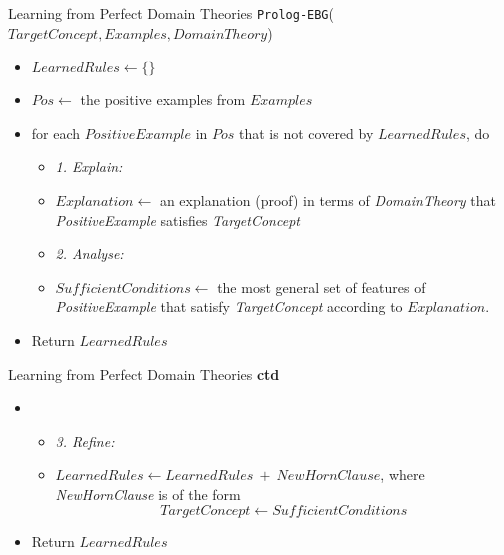 \documentclass[%
pdf,
colorBG,
slideColor,
tcrico,
]{prosper}
\begin{document}

\begin{slide}{Learning from Perfect Domain Theories}
\tiny
	\texttt{Prolog-EBG}($TargetConcept, Examples, DomainTheory$)
	
	\begin{itemize}
	\item $LearnedRules \gets \{\}$
	\item $Pos \gets$ the positive examples from $Examples$ 
	\item
	for each $PositiveExample$ in $Pos$ that is not covered by $LearnedRules$, do
	\begin{itemize}
	\item[]\hspace*{-.18in}\hskip-12pt{\em 1. Explain:}
	\item $Explanation \gets $ an explanation (proof) in terms of {\em
	DomainTheory} that {\em PositiveExample} satisfies {\em TargetConcept}
	
	\item[]\hspace*{-.18in}\hskip-12pt{\em 2. Analyse:}
	\item 
	$SufficientConditions \gets $ the most general set of features of {\em PositiveExample} that satisfy {\em TargetConcept} according to $Explanation$.
	\end{itemize}	
	\item
	Return $LearnedRules$
	\end{itemize}
\end{slide}

	
\begin{slide}{Learning from Perfect Domain Theories \textbf{ctd}}
\tiny
\begin{itemize}
 \item 
 \begin{itemize}
	\item[]\hspace*{-.18in}\hskip-12pt{\em 3. Refine:}
	\item
	$LearnedRules \gets LearnedRules \ + \ NewHornClause$, where {\em
	NewHornClause} is of the form
	\[TargetConcept \gets  SufficientConditions \]
	\end{itemize}	
	\item
	Return $LearnedRules$
	\end{itemize}
\end{slide}

\end{document}
